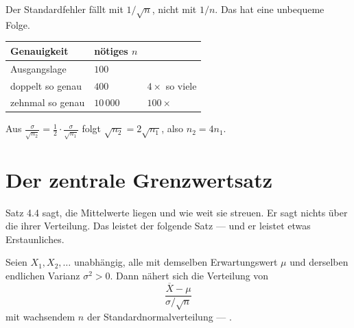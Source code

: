 \begin{merksatz}
Der Standardfehler fällt mit $1/\sqrt{n}$, nicht mit $1/n$. Das hat eine unbequeme Folge.

\begin{center}
\renewcommand{\arraystretch}{1.48}
\begin{tabular}{@{}P{2.8cm}P{2.4cm}P{2.6cm}@{}}
\toprule
\textbf{Genauigkeit} & \textbf{nötiges $n$} & \\
\midrule
Ausgangslage & $100$ & \\
doppelt so genau & $400$ & $4\times$ so viele\\
zehnmal so genau & $10\,000$ & $100\times$\\
\bottomrule
\end{tabular}
\end{center}

Aus $\frac{\sigma}{\sqrt{n_2}} = \frac{1}{2}\cdot\frac{\sigma}{\sqrt{n_1}}$ folgt $\sqrt{n_2} = 2\sqrt{n_1}$, also $n_2 = 4n_1$.

\begin{center}
\begin{minipage}{0.88\textwidth}
\end{minipage}
\end{center}
\end{merksatz}

\section{Der zentrale Grenzwertsatz}

Satz 4.4 sagt,  die Mittelwerte liegen und wie weit sie streuen. Er sagt nichts über die  ihrer Verteilung. Das leistet der folgende Satz --- und er leistet etwas Erstaunliches.

\begin{merksatz}
Seien $X_1, X_2, \ldots$ unabhängig, alle mit demselben Erwartungswert $\mu$ und derselben endlichen Varianz $\sigma^2 > 0$. Dann nähert sich die Verteilung von
\[ \frac{\overline{X} - \mu}{\sigma/\sqrt n} \]
mit wachsendem $n$ der Standardnormalverteilung --- .
\end{merksatz}

